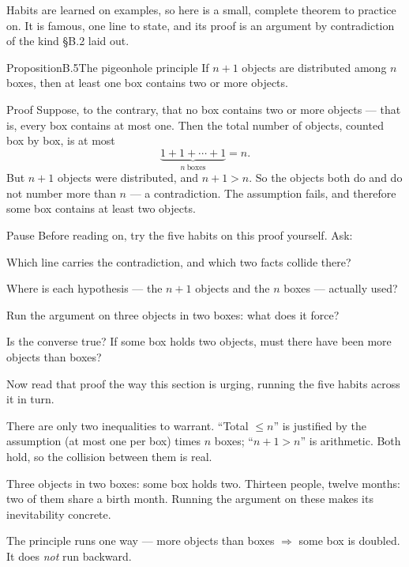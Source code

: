 \documentclass[a4paper,12pt,oneside]{memoir}
\begin{document}

Habits are learned on examples, so here is a small, complete theorem to practice on. It is famous, one line to state, and its proof is an argument by contradiction of the kind §B.2 laid out.

\begin{envproposition}{Proposition}{B.5}{The pigeonhole principle}
If \(n + 1\) objects are distributed among \(n\) boxes, then at least one box contains two or more objects.
\end{envproposition}

\begin{envproof}{Proof}{}{}
Suppose, to the contrary, that no box contains two or more objects — that is, every box contains at most one. Then the total number of objects, counted box by box, is at most
\[ \underbrace{1 + 1 + \cdots + 1}_{n\ \text{boxes}} = n. \]
But \(n + 1\) objects were distributed, and \(n + 1 > n\). So the objects both do and do not number more than \(n\) — a contradiction. The assumption fails, and therefore some box contains at least two objects. \qedmark
\end{envproof}

\begin{envremark}{Pause}{}{}
Before reading on, try the five habits on this proof yourself. Ask:
\begin{steps}
  \item Which line carries the contradiction, and which two facts collide there?
  \item Where is each hypothesis — the \(n + 1\) objects and the \(n\) boxes — actually used?
  \item Run the argument on three objects in two boxes: what does it force?
  \item Is the converse true? If some box holds two objects, must there have been more objects than boxes?
\end{steps}
\end{envremark}

Now read that proof the way this section is urging, running the five habits across it in turn.

\begin{sollist}
  \item {} There are only two inequalities to warrant. “Total \(\le n\)” is justified by the assumption (at most one per box) times \(n\) boxes; “\(n + 1 > n\)” is arithmetic. Both hold, so the collision between them is real.
  \item {} Three objects in two boxes: some box holds two. Thirteen people, twelve months: two of them share a birth month. Running the argument on these makes its inevitability concrete.
  \item {} The principle runs one way — more objects than boxes \(\Rightarrow\) some box is doubled. It does \emph{not} run backward.
\end{sollist}
\end{document}
